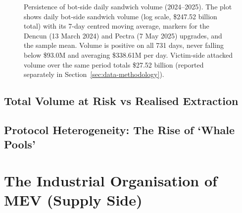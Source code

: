 \documentclass[pdflatex, sn-basic]{sn-jnl}
\theoremstyle{thmstylethree}%
\begin{document}
    \begin{figure}[htb]
		\centering
		
		\caption{Persistence of bot-side daily sandwich volume (2024--2025).
        The plot shows daily bot-side sandwich volume (log scale, \$\num{247.52} billion total)
        with its \num{7}-day centred moving average, markers for the Dencun (13 March 2024)
        and Pectra (7 May 2025) upgrades, and the sample mean.
        Volume is positive on all \num{731} days, never falling below \$\num{93.0}M and
        averaging \$\num{338.61}M per day.
        Victim-side attacked volume over the same period totals \$\num{27.52} billion
        (reported separately in Section~\ref{sec:data-methodology}).}
	\end{figure}

    \FloatBarrier

	\subsection{Total Volume at Risk vs Realised Extraction}
	\label{subsec:volume-vs-extraction}



	\subsection{Protocol Heterogeneity: The Rise of `Whale Pools'}
	\label{subsec:protocol-heterogeneity}


	\section{The Industrial Organisation of MEV (Supply Side)}
	\label{sec:supply-side-io}
\end{document}
